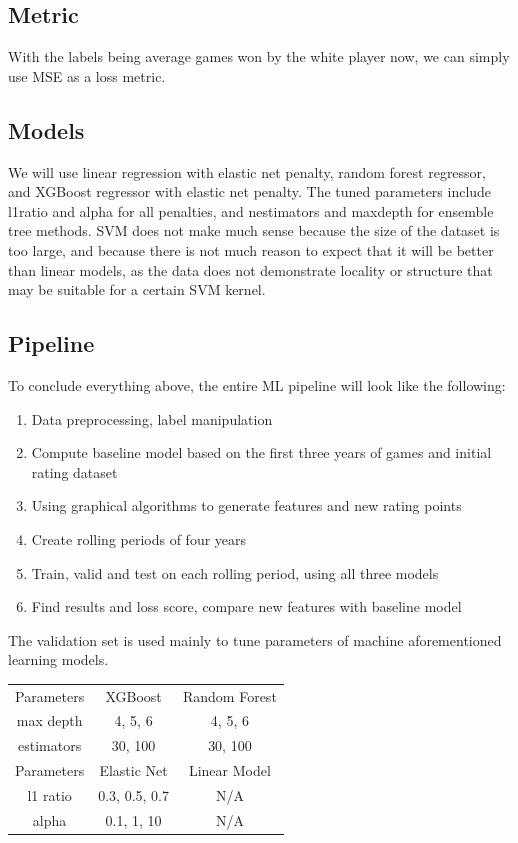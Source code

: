 \documentclass[12pt, letterpaper]{article}
\begin{document}
\begin{multicols}{2}
\subsection*{Metric}

With the labels being average games won by the white player now, we can simply use MSE as a loss metric. 

\subsection*{Models}

We will use linear regression with elastic net penalty, random forest regressor, and XGBoost regressor with elastic net penalty. The tuned parameters include l1\textunderscore ratio and alpha for all penalties, and n\textunderscore estimators and max\textunderscore depth for ensemble tree methods. SVM does not make much sense because the size of the dataset is too large, and because there is not much reason to expect that it will be better than linear models, as the data does not demonstrate locality or structure that may be suitable for a certain SVM kernel.

\subsection*{Pipeline}

To conclude everything above, the entire ML pipeline will look like the following:
\begin{enumerate}
	\item Data preprocessing, label manipulation
	\item Compute baseline model based on the first three years of games and initial rating dataset
	\item Using graphical algorithms to generate features and new rating points
	\item Create rolling periods of four years
	\item Train, valid and test on each rolling period, using all three models
	\item Find results and loss score, compare new features with baseline model
\end{enumerate}

The validation set is used mainly to tune parameters of machine aforementioned learning models.


\begin{center}
\begin{tabular}{ |ccc| } \hline
	Parameters & XGBoost & Random Forest \\
	max depth & 4, 5, 6 & 4, 5, 6 \\
	estimators & 30, 100 & 30, 100 \\ \hline
	Parameters & Elastic Net & Linear Model \\
	l1 ratio & 0.3, 0.5, 0.7 & N/A \\
	alpha & 0.1, 1, 10 & N/A \\ \hline
\end{tabular}
\end{center}


\end{multicols}
\end{document}
